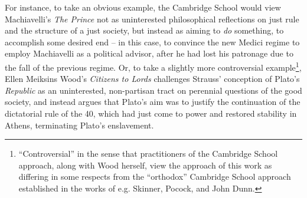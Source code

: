 For instance, to take an obvious example, the Cambridge School would view Machiavelli's \textit{The Prince} not as uninterested philosophical reflections on just rule and the structure of a just society, but instead as aiming to \textit{do} something, to accomplish some desired end -- in this case, to convince the new Medici regime to employ Machiavelli as a political advisor, after he had lost his patronage due to the fall of the previous regime. Or, to take a slightly more controversial example\footnote{``Controversial'' in the sense that practitioners of the Cambridge School approach, along with Wood herself, view the approach of this work as differing in some respects from the ``orthodox'' Cambridge School approach established in the works of e.g. Skinner, Pocock, and John Dunn.}, Ellen Meiksins Wood's \textit{Citizens to Lords} challenges Strauss' conception of Plato's \textit{Republic} as an uninterested, non-partisan tract on perennial questions of the good society, and instead argues that Plato's aim was to justify the continuation of the dictatorial rule of the 40, which had just come to power and restored stability in Athens, terminating Plato's enslavement.

